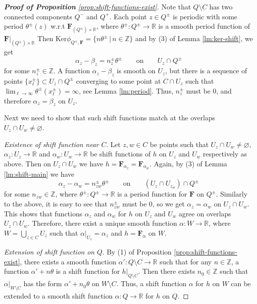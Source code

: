 \documentclass[10pt,reqno]{amsart}
\newcommand{\bbR}{\mathbb{R}}
\newcommand{\bbZ}{\mathbb{Z}}
\newcommand{\bfF}{\mathbf{F}}
\renewcommand{\ker}{\mathrm{Ker}}
\begin{document}
{\begin{proof}[{\bf Proof of Proposition} {\rm\ref{prop:shift-functions-exist}}]
	{ Note that $Q\setminus C$ has two connected components $Q^-$ and $Q^+$. 
	Each point $z\in Q^{\pm}$ is  periodic with some period $\theta^{\pm}(z)$ w.r.t $\bfF_{(Q^{\pm})\times\bbR}$, where  $\theta^{\pm}:Q^{\pm}\to \bbR$ is a smooth period function of $\bfF|_{(Q^{\pm})\times\bbR}$ Then $\ker\phi_{Q^{\pm},\bfF} = \{n\theta^{\pm}\,|\, n\in\bbZ\}$ and  by (3) of Lemma \ref{lm:ker-shift}, we get 
	$$
		\alpha_z-\beta_z = n^{\pm}_z\theta^{\pm}\qquad\text{on}\qquad U_z\cap Q^{\pm}
	$$		
	for some $n_z^{\pm}\in\bbZ.$
	A function $\alpha_z-\beta_z$ is smooth on $U_z$, but there is a sequence of points $\{x^{\pm}_{\ell}\}\subset U_z\cap Q^{\pm}$ converging to some point at $C\cap U_z$ such that $\lim_{\ell\to \infty}\theta^{\pm}(x^{\pm}_{\ell}) = \infty$, see Lemma \ref{lm:period}. Thus, $n^{\pm}_z$  must be $0$, and therefore $\alpha_z = \beta_z$ on $U_z$.
}	

	
	 Next we need to show that such shift functions match at the overlaps $U_z\cap U_w\neq \varnothing$.

	{\it Existence of shift function near $C$}.
	 Let $z,w\in C$ be  points such that $U_z\cap U_w\neq \varnothing$, $\alpha_z:U_z\to \bbR$ and $\alpha_w:U_w\to \mathbb{R}$ be shift functions of $h$ on $U_z$ and $U_w$ respectively as above. Then on $U_{z}\cap U_{w}$ we have $h = \mathbf{F}_{\alpha_{z}} = \bfF_{\alpha_w}$.
	  {Again, by (3) of Lemma \ref{lm:shift-main} we have 
	$$
	\alpha_z -\alpha_w = n^{\pm}_{zw}\theta^{\pm}\qquad\text{on}\qquad (U_{z}\cap U_{z_w})\cap Q^{\pm}
	$$	 
	for some $n_{zw}\in \mathbb{Z}$, where
	$\theta^{\pm} :Q^{\pm}\to \mathbb{R}$ is a period function for
	$\mathbf{F}$ on $Q^{\pm}$.
 	Similarly to the above, it is easy to see that $n^{\pm}_{zw}$ must be $0$, so  we get $\alpha_{z} = \alpha_w$ on $U_{z}\cap U_{w}$. This shows that  functions $\alpha_z$ and $\alpha_w$ for $h$ on $U_z$ and $U_w$ agree on overlaps $U_z\cap U_w$. 
 	Therefore, there exist a unique smooth function $\alpha:W\to \bbR$, where $W =  \bigcup_{z\in C}U_{z}$  such that $\alpha|_{U_{z}} = \alpha_z$ and  $h = \bfF_{\alpha}$ on $W$.
}
	  
	 {\it Extension of shift function on $Q$}.
	 By (1) of Proposition \ref{prop:shift-functions-exist}, there exists a smooth function $\alpha':Q\setminus C\to \mathbb{R}$ such that for any $n\in\bbZ$, a function $\alpha'+n\theta$ is a shift function for $h|_{Q\setminus C}$. Then there exists $n_0\in \bbZ$ such that $\alpha|_{W\setminus C}$  has the form $ \alpha'+n_0\theta$ on $W\setminus C$. Thus, a shift function $\alpha$ for $h$ on $W$ can be extended to a smooth shift function $\alpha:Q\to \bbR$ for $h$ on $Q$.
\end{proof}

}
\end{document}
